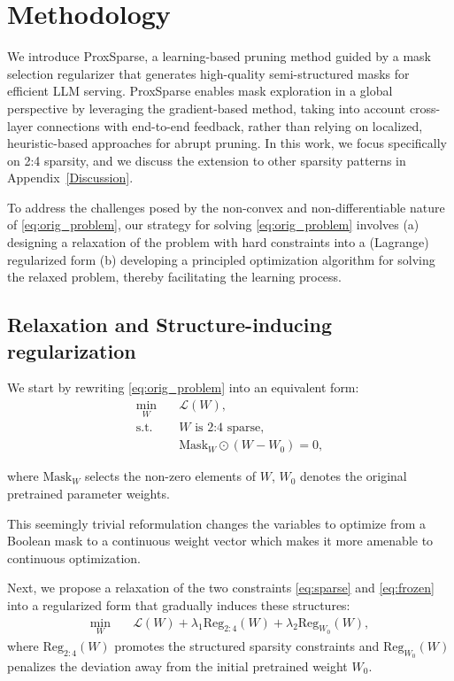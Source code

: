 
\section{Methodology}
\label{sec:method}


We introduce ProxSparse, a learning-based pruning method guided by a mask selection regularizer that generates high-quality semi-structured masks for efficient LLM serving. ProxSparse enables mask exploration in a global perspective by leveraging the gradient-based method, taking into account cross-layer connections with end-to-end feedback, rather than relying on localized, heuristic-based approaches for abrupt pruning. In this work, we focus specifically on 2:4 sparsity, 
and we discuss the extension to other sparsity patterns in Appendix~\ref{Discussion}.

To address the challenges posed by the non-convex and non-differentiable nature of \eqref{eq:orig_problem}, our strategy for solving \eqref{eq:orig_problem} involves (a) designing a relaxation of the problem with hard constraints into a (Lagrange) regularized form (b) developing a principled optimization algorithm for solving the relaxed problem, thereby facilitating the learning process.


\subsection{Relaxation and Structure-inducing regularization}
We start by rewriting \eqref{eq:orig_problem} into an equivalent form:
\begin{subequations}
\begin{align}
\min_{W}&\quad \mathcal{L}(W),\nonumber\\%
\text{s.t.}& \quad W \text{ is 2:4 sparse}, \label{eq:sparse} \\
&\quad \text{Mask}_{W}\odot(W - W_0) = 0 \label{eq:frozen}, 
\end{align}
\end{subequations}

where $\text{Mask}_{W}$ selects the non-zero elements of $W$, $W_{0}$ denotes the original pretrained parameter weights.

This seemingly trivial reformulation changes the variables to optimize from a Boolean mask to a continuous weight vector which makes it more amenable to continuous optimization. 

Next, we propose a relaxation of the two constraints \eqref{eq:sparse} and \eqref{eq:frozen} into a regularized form that gradually induces these structures:
\begin{equation}\label{eq:reg}
\begin{aligned}
\min_{W}& \quad \mathcal{L}(W) + \lambda_1 \text{Reg}_{2:4}(W) + \lambda_2 \text{Reg}_{W_0}(W),
\end{aligned}
\end{equation}
where $\text{Reg}_{2:4}(W)$ promotes the structured sparsity constraints and $\text{Reg}_{W_0}(W)$ penalizes the deviation away from the initial pretrained weight $W_0$.


